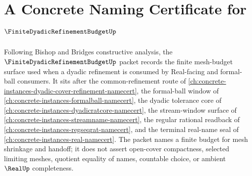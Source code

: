 \chapter{A Concrete Naming Certificate for $\FiniteDyadicRefinementBudgetUp$}
\label{ch:concrete-instances-finite-dyadic-refinement-budget-namecert}

Following Bishop and Bridges constructive analysis, the $\FiniteDyadicRefinementBudgetUp$ packet records the finite mesh-budget surface used when a dyadic refinement is consumed by Real-facing and formal-ball consumers. It sits after the common-refinement route of \autoref{ch:concrete-instances-dyadic-cover-refinement-namecert}, the formal-ball window of \autoref{ch:concrete-instances-formalball-namecert}, the dyadic tolerance core of \autoref{ch:concrete-instances-dyadicratcore-namecert}, the stream-window surface of \autoref{ch:concrete-instances-streamname-namecert}, the regular rational readback of \autoref{ch:concrete-instances-regseqrat-namecert}, and the terminal real-name seal of \autoref{ch:concrete-instances-real-namecert}. The packet names a finite budget for mesh shrinkage and handoff; it does not assert open-cover compactness, selected limiting meshes, quotient equality of names, countable choice, or ambient $\RealUp$ completeness.


